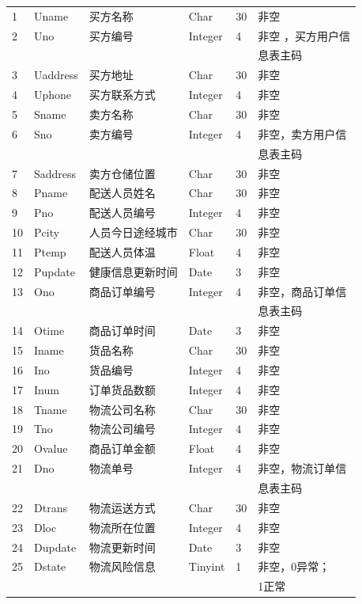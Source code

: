 \documentclass[12pt]{article}
\begin{document}
\begin{center}
\begin{supertabular}{llllll}
	1 &	Uname &	买方名称 &	Char &	30 &	非空 \\
	2 &	Uno &	买方编号 &	Integer & 4 &	非空 ，买方用户信  \\ &&&&& 息表主码\\
	3 &	Uaddress &	买方地址 &	Char &	30 &	非空 \\
	4 &	Uphone &	买方联系方式 &	Integer &	4 &	非空 \\
	5 &	Sname &	卖方名称 &	Char &	30 	& 非空\\
	6 &	Sno &	卖方编号 &	Integer &	4 	& 非空，卖方用户信 \\ &&&&& 息表主码 \\
	7 &	Saddress &	卖方仓储位置 &	Char &	30 	& 非空 \\
	8 &	Pname &	配送人员姓名 &	Char &	30 &	非空 \\
	9 &	Pno &	配送人员编号 &	Integer &	4 &	非空 \\
	10 &	Pcity &	人员今日途经城市 &	Char &	30 & 非空 \\
	11  &	Ptemp &	配送人员体温 &	Float &	4 &	非空 \\
	12 &	Pupdate &	健康信息更新时间 &	Date &	3 &	非空 \\
	13 &	Ono &	商品订单编号 &	Integer &	4 &	非空，商品订单信 \\ &&&&& 息表主码\\
	14 &	Otime &	商品订单时间 &	Date &	3 &	非空 \\
	15 &	Iname 	& 货品名称 &	Char &	30 &	非空 \\
	16 &	Ino &	货品编号 &	Integer &	4 &	非空 \\
	17 &	Inum &	订单货品数额 &	Integer &	4 &	非空 \\
	18 &	Tname &	物流公司名称 &	Char &	30 	& 非空 \\
	19 &	Tno &	物流公司编号 &	 Integer &	4 &	非空 \\
	20 &	Ovalue 	& 商品订单金额 	& Float &	4 &	非空 \\
	21 & Dno &	物流单号 &	Integer &	4 &	非空，物流订单信 \\ &&&&& 息表主码 \\
	22 &	Dtrans &	物流运送方式 &	Char &	30 &	非空 \\
	23 &	Dloc &	物流所在位置 &	Integer &	4 &	非空 \\
	24 &	Dupdate &	物流更新时间 &	Date &	3 &	非空 \\
	25 &	Dstate &	物流风险信息 &	Tinyint &	1 &	非空，0异常； \\ &&&&& 1正常\\

\end{supertabular}
\end{center}
\end{document}
